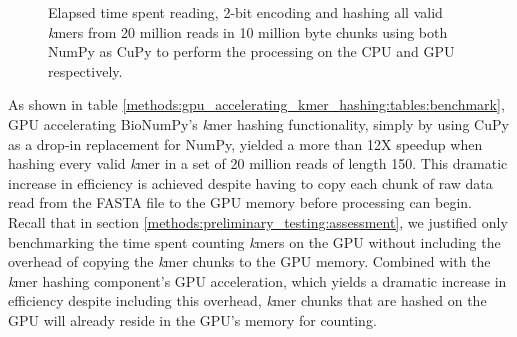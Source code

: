 \begin{figure}[H]
\begin{center}
\end{center}
\caption{
  Elapsed time spent reading, 2-bit encoding and hashing all valid \textit{k}mers from 20 million reads in 10 million byte chunks using both NumPy as CuPy to perform the processing on the CPU and GPU respectively.
}
\label{methods:gpu_accelerating_kmer_hashing:figures:benchmark}
\end{figure}

As shown in table \ref{methods:gpu_accelerating_kmer_hashing:tables:benchmark}, GPU accelerating BioNumPy's \textit{k}mer hashing functionality, simply by using CuPy as a drop-in replacement for NumPy, yielded a more than 12X speedup when hashing every valid \textit{k}mer in a set of 20 million reads of length 150.
This dramatic increase in efficiency is achieved despite having to copy each chunk of raw data read from the FASTA file to the GPU memory before processing can begin.
Recall that in section \ref{methods:preliminary_testing:assessment}, we justified only benchmarking the time spent counting \textit{k}mers on the GPU without including the overhead of copying the \textit{k}mer chunks to the GPU memory.
Combined with the \textit{k}mer hashing component's GPU acceleration, which yields a dramatic increase in efficiency despite including this overhead, \textit{k}mer chunks that are hashed on the GPU will already reside in the GPU's memory for counting.

